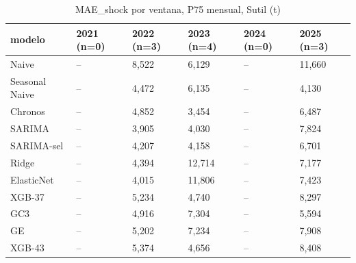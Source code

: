 \begin{table}[H]
\centering
\small
\caption{MAE\_shock por ventana, P75 mensual, Sutil (t)}
\label{tab:T05_MAE_shock_P75_por_ventana_sutil}
\begin{tabular}{llllll}
\toprule
modelo & 2021 (n=0) & 2022 (n=3) & 2023 (n=4) & 2024 (n=0) & 2025 (n=3) \\
\midrule
Naive & -- & 8,522 & 6,129 & -- & 11,660 \\
Seasonal Naive & -- & 4,472 & 6,135 & -- & 4,130 \\
Chronos & -- & 4,852 & 3,454 & -- & 6,487 \\
SARIMA & -- & 3,905 & 4,030 & -- & 7,824 \\
SARIMA-sel & -- & 4,207 & 4,158 & -- & 6,701 \\
Ridge & -- & 4,394 & 12,714 & -- & 7,177 \\
ElasticNet & -- & 4,015 & 11,806 & -- & 7,423 \\
XGB-37 & -- & 5,234 & 4,740 & -- & 8,297 \\
GC3 & -- & 4,916 & 7,304 & -- & 5,594 \\
GE & -- & 5,202 & 7,234 & -- & 7,908 \\
XGB-43 & -- & 5,374 & 4,656 & -- & 8,408 \\
\bottomrule
\end{tabular}
\end{table}